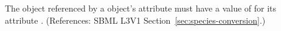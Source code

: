 The \Parameter object referenced by a \Species object's
 attribute must have a value of  for its
attribute .  (References: SBML L3V1
Section~\ref{sec:species-conversion}.)
